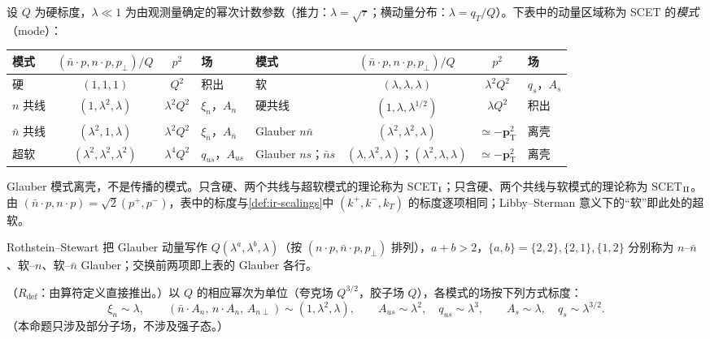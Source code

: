 \begin{definition}[模式]\label{def:scet-modes}
设 $Q$ 为硬标度，$\lambda\ll1$ 为由观测量确定的幂次计数参数（推力：$\lambda=\sqrt\tau$；横动量分布：$\lambda=q_T/Q$）。下表中的动量区域称为 SCET 的\emph{模式}（mode）：
\begin{center}\small
\renewcommand{\arraystretch}{1.1}
\begin{tabular}{@{}lccl@{\qquad}lccl@{}}
\toprule
模式 & $(\bar n\cdot p,n\cdot p,p_\perp)/Q$ & $p^2$ & 场 & 模式 & $(\bar n\cdot p,n\cdot p,p_\perp)/Q$ & $p^2$ & 场\\
\midrule
硬 & $(1,1,1)$ & $Q^2$ & 积出 & 软 & $(\lambda,\lambda,\lambda)$ & $\lambda^2Q^2$ & $q_s$，$A_s$ \\
$n$ 共线 & $(1,\lambda^2,\lambda)$ & $\lambda^2Q^2$ & $\xi_n$，$A_n$ & 硬共线 & $(1,\lambda,\lambda^{1/2})$ & $\lambda Q^2$ & 积出 \\
$\bar n$ 共线 & $(\lambda^2,1,\lambda)$ & $\lambda^2Q^2$ & $\xi_{\bar n}$，$A_{\bar n}$ & Glauber $n\bar n$ & $(\lambda^2,\lambda^2,\lambda)$ & $\simeq-\bm p_{\mathrm T}^2$ & 离壳 \\
超软 & $(\lambda^2,\lambda^2,\lambda^2)$ & $\lambda^4Q^2$ & $q_{us}$，$A_{us}$ & Glauber $ns$；$\bar ns$ & $(\lambda,\lambda^2,\lambda)$；$(\lambda^2,\lambda,\lambda)$ & $\simeq-\bm p_{\mathrm T}^2$ & 离壳 \\
\bottomrule
\end{tabular}
\end{center}
Glauber 模式离壳，不是传播的模式。只含硬、两个共线与超软模式的理论称为 SCET$_{\rm I}$；只含硬、两个共线与软模式的理论称为 SCET$_{\rm II}$。由 $(\bar n\cdot p,n\cdot p)=\sqrt2(p^+,p^-)$，表中的标度与\cref{def:ir-scalings}中 $(k^+,k^-,k_T)$ 的标度逐项相同；Libby--Sterman 意义下的“软”即此处的超软。
\end{definition}

Rothstein--Stewart 把 Glauber 动量写作 $Q(\lambda^a,\lambda^b,\lambda)$（按 $(n\cdot p,\bar n\cdot p,p_\perp)$ 排列），$a+b>2$，$\{a,b\}=\{2,2\},\{2,1\},\{1,2\}$ 分别称为 $n$–$\bar n$、软–$n$、软–$\bar n$ Glauber\cite[表~1]{RothsteinStewart2016}；交换前两项即上表的 Glauber 各行。

\begin{proposition}\label{prop:scet-scalings}
（$R_{\mathrm{def}}$：由算符定义直接推出。）以 $Q$ 的相应幂次为单位（夸克场 $Q^{3/2}$，胶子场 $Q$），各模式的场按下列方式标度：
\begin{equation}\label{eq:scet-fieldscaling}
\xi_n\sim\lambda,\qquad (\bar n\cdot A_n,\,n\cdot A_n,\,A_{n\perp})\sim(1,\lambda^2,\lambda),\qquad
A_{us}\sim\lambda^2,\quad q_{us}\sim\lambda^3,\qquad A_s\sim\lambda,\quad q_s\sim\lambda^{3/2}.
\end{equation}
（本命题只涉及部分子场，不涉及强子态。）
\end{proposition}

